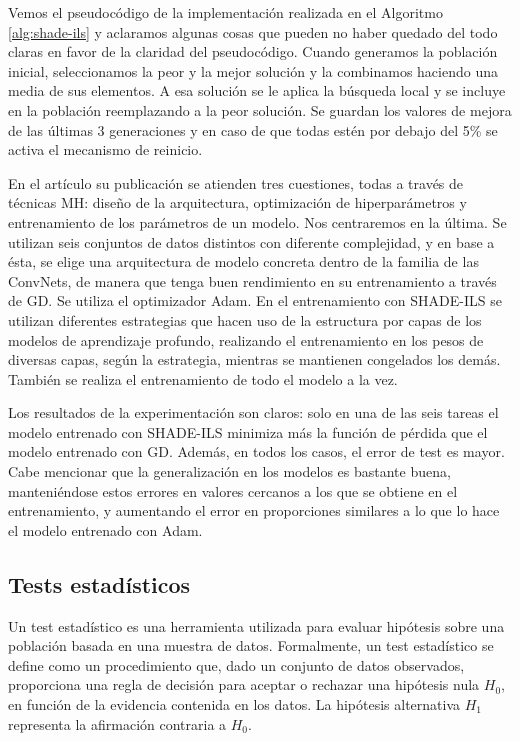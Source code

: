 Vemos el pseudocódigo de la implementación realizada en el Algoritmo \ref{alg:shade-ils} y aclaramos algunas cosas que pueden no haber quedado del todo claras en favor de la claridad del pseudocódigo. Cuando generamos la población inicial, seleccionamos la peor y la mejor solución y la combinamos haciendo una media de sus elementos. A esa solución se le aplica la búsqueda local y se incluye en la población reemplazando a la peor solución. Se guardan los valores de mejora de las últimas 3 generaciones y en caso de que todas estén por debajo del 5\% se activa el mecanismo de reinicio.



En el artículo su publicación \cite{shadeils} se atienden tres cuestiones, todas a través de técnicas MH: diseño de la arquitectura, optimización de hiperparámetros y entrenamiento de los parámetros de un modelo. Nos centraremos en la última. Se utilizan seis conjuntos de datos distintos con diferente complejidad, y en base a ésta, se elige una arquitectura de modelo concreta dentro de la familia de las ConvNets, de manera que tenga buen rendimiento en su entrenamiento a través de GD. Se utiliza el optimizador Adam. En el entrenamiento con SHADE-ILS se utilizan diferentes estrategias que hacen uso de la estructura por capas de los modelos de aprendizaje profundo, realizando el entrenamiento en los pesos de diversas capas, según la estrategia, mientras se mantienen congelados los demás. También se realiza el entrenamiento de todo el modelo a la vez.

Los resultados de la experimentación son claros: solo en una de las seis tareas el modelo entrenado con SHADE-ILS minimiza más la función de pérdida que el modelo entrenado con GD. Además, en todos los casos, el error de test es mayor. Cabe mencionar que la generalización en los modelos es bastante buena, manteniéndose estos errores en valores cercanos a los que se obtiene en el entrenamiento, y aumentando el error en proporciones similares a lo que lo hace el modelo entrenado con Adam.

\subsection{Tests estadísticos}

Un test estadístico es una herramienta utilizada para evaluar hipótesis sobre una población basada en una muestra de datos. Formalmente, un test estadístico se define como un procedimiento que, dado un conjunto de datos observados, proporciona una regla de decisión para aceptar o rechazar una hipótesis nula $H_0$, en función de la evidencia contenida en los datos. La hipótesis alternativa $H_1$ representa la afirmación contraria a $H_0$.

